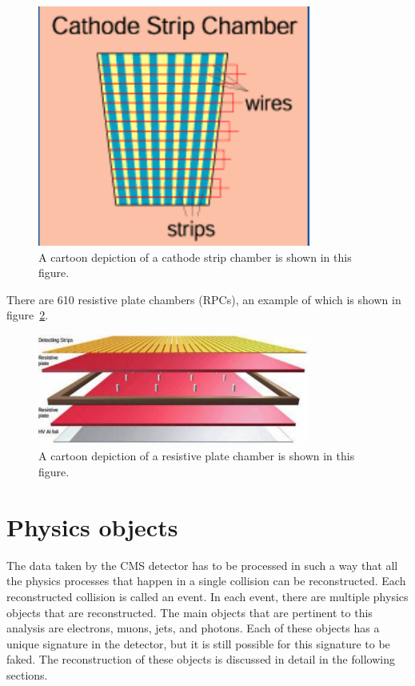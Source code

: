 \begin{figure}[!ht]
\begin{center}
\includegraphics[width=0.8\textwidth]{cms/figs/CSC.pdf}
\caption{ A cartoon depiction of a cathode strip chamber is shown in this figure. 
\label{fig:CSC}
}
\end{center}
\end{figure}

There are 610 resistive plate chambers (RPCs), an example of which is shown in figure~\ref{fig:RPC}.

\begin{figure}[!htb]
  \begin{center}
    \includegraphics[width=0.8\textwidth]{cms/figs/RPClayers.pdf}
    \caption{
      \label{fig:RPC}
      A cartoon depiction of a resistive plate chamber is shown in this figure. 
    }
  \end{center}
\end{figure}


\section{Physics objects}
The data taken by the CMS detector has to be processed in such a way that all the physics processes that happen in a single collision can be reconstructed.
Each reconstructed collision is called an event.
In each event, there are multiple physics objects that are reconstructed.
The main objects that are pertinent to this analysis are electrons, muons, jets, and photons.
Each of these objects has a unique signature in the detector, but it is still possible for this signature to be faked.
The reconstruction of these objects is discussed in detail in the following sections.

